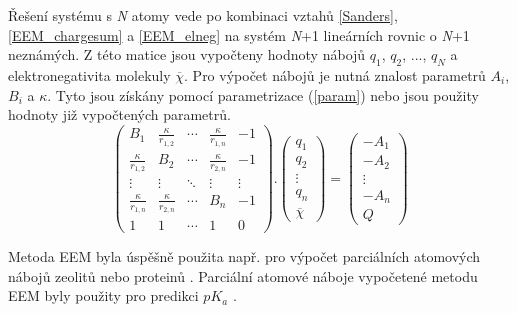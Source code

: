 Řešení systému s \textit{N} atomy vede po kombinaci vztahů  \ref{Sanders}, \ref{EEM_chargesum} a \ref{EEM_elneg} na systém \textit{N}+1 lineárních rovnic o \textit{N}+1 neznámých. Z této matice jsou vypočteny hodnoty nábojů $q_1$, $q_2$, ..., $q_N$ a elektronegativita molekuly $\overline{\chi}$. Pro výpočet nábojů je nutná znalost parametrů $A_i$, $B_i$ a $\kappa$. Tyto jsou získány pomocí parametrizace (\ref{param}) nebo jsou použity hodnoty již vypočtených parametrů. 
\begin{equation}
\label{EEM_matrix}
 \begin{pmatrix}
  B_{1} & \frac{\kappa}{r_{1,2}} & \cdots & \frac{\kappa}{r_{1,n}} & -1\\
  \frac{\kappa}{r_{1,2}} & B_{2} & \cdots & \frac{\kappa}{r_{2,n}} & -1 \\
  \vdots  & \vdots  & \ddots & \vdots & \vdots  \\
  \frac{\kappa}{r_{1,n}} & \frac{\kappa}{r_{2,n}} & \cdots & B_{n} & -1 \\
  1 & 1 & \cdots & 1 & 0
 \end{pmatrix} .
 \begin{pmatrix}
 q_{1} \\ q_{2} \\ \vdots \\ q_{n} \\ \overline{\chi}
 \end{pmatrix} =
 \begin{pmatrix}
 -A_{1} \\ -A_{2} \\ \vdots \\ -A_{n} \\ Q
 \end{pmatrix}
\end{equation}

Metoda EEM byla úspěšně použita např. pro výpočet parciálních atomových nábojů zeolitů \cite{zeolites} nebo proteinů \cite{eem_protein}. Parciální atomové náboje vypočetené metodu EEM byly použity pro predikci $pK_a$ \cite{QSPR2}.



